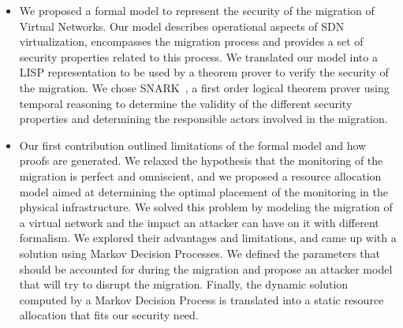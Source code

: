 \begin{itemize}
    \item We proposed a formal model to represent the security of the migration of Virtual Networks.
    Our model describes operational aspects of SDN virtualization, encompasses the migration process and provides a set of security properties related to this process. We translated our model into a LISP representation to be used by a theorem prover to verify the security of the migration. We chose SNARK~\cite{snark-Stickel2000}, a first order logical theorem prover using temporal reasoning to determine the validity of the different security properties and determining the responsible actors involved in the migration.
    
    \item Our first contribution outlined limitations of the formal model and how proofs are generated. We relaxed the hypothesis that the monitoring of the migration is perfect and omniscient, and we proposed a resource allocation model aimed at determining the optimal placement of the monitoring in the physical infrastructure. We solved this problem by modeling the migration of a virtual network and the impact an attacker can have on it with different formalism. We explored their advantages and limitations, and came up with a solution using Markov Decision Processes. We defined the parameters that should be accounted for during the migration and propose an attacker model that will try to disrupt the migration. Finally, the dynamic solution computed by a Markov Decision Process is translated into a static resource allocation that fits our security need.
\end{itemize}



